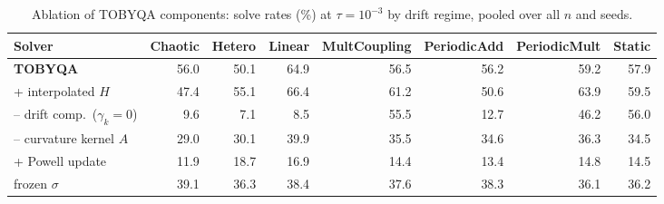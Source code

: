 \begin{table}[t]
\centering\footnotesize
\setlength{\tabcolsep}{2.2pt}
\caption{Ablation of TOBYQA components: solve rates (\%) at $\tau=10^{-3}$ by drift regime, pooled over all $n$ and seeds.}
\label{tab:ablation}
\begin{tabular}{lrrrrrrr}
\toprule
Solver & Chaotic & Hetero & Linear & MultCoupling & PeriodicAdd & PeriodicMult & Static \\
\midrule
\textbf{TOBYQA} & 56.0 & 50.1 & 64.9 & 56.5 & 56.2 & 59.2 & 57.9 \\
\quad + interpolated $H$ & 47.4 & 55.1 & 66.4 & 61.2 & 50.6 & 63.9 & 59.5 \\
\quad -- drift comp.\ ($\gamma_k{=}0$) & 9.6 & 7.1 & 8.5 & 55.5 & 12.7 & 46.2 & 56.0 \\
\quad -- curvature kernel $A$ & 29.0 & 30.1 & 39.9 & 35.5 & 34.6 & 36.3 & 34.5 \\
\quad + Powell update & 11.9 & 18.7 & 16.9 & 14.4 & 13.4 & 14.8 & 14.5 \\
\quad frozen $\sigma$ & 39.1 & 36.3 & 38.4 & 37.6 & 38.3 & 36.1 & 36.2 \\
\bottomrule
\end{tabular}
\end{table}
